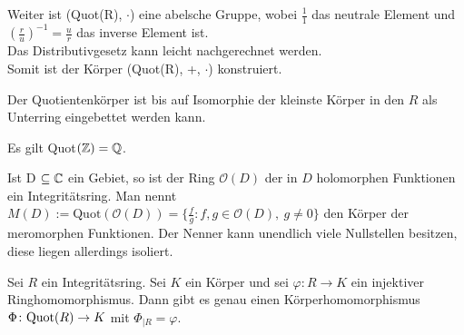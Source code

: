 {Weiter ist (Quot(R), $\cdot$) eine abelsche Gruppe, wobei $\frac{1}{1}$ das neutrale Element und $\left(\frac{r}{u}\right)^{-1} = \frac{u}{r}$ das inverse Element ist. \\
Das Distributivgesetz kann leicht nachgerechnet werden. \\
Somit ist der Körper (Quot(R), +, $\cdot$) konstruiert.
}
%
%
% 
%
%
\begin{bem}
Der Quotientenkörper ist bis auf Isomorphie der kleinste Körper in den $R$ als Unterring eingebettet werden kann.
\end{bem}
%
%
%
%
\begin{bsp}
Es gilt Quot$(\mathbb{Z}) = \mathbb{Q}$.

\end{bsp}
%
%
%
\begin{bsp}
Ist D $\subseteq \mathbb{C}$ ein Gebiet, so ist der Ring $ \mathcal{O} (D) $ der in $D$ holomorphen Funktionen ein Integritätsring. Man nennt
$ M \left(D\right) := \text{Quot}\left( \mathcal{O} \left( D \right)\right) = \lbrace \frac{f}{g}: f,g \in \mathcal{O} (D), ~g \neq 0\rbrace$ den Körper der meromorphen Funktionen. Der Nenner kann unendlich viele Nullstellen besitzen, diese liegen allerdings isoliert. 
\end{bsp}
%
%
%
\begin{satz}\label{UniverselleEigenschaftQuot}
Sei $R$ ein Integritätsring. Sei $K$ ein Körper und sei $\varphi\colon R\to K$ ein injektiver Ringhomomorphismus. Dann gibt es genau einen Körperhomomorphismus $\Phi\colon \textup{Quot}(R) \to K$ mit $\Phi_{|R}=\varphi$.  
\end{satz}
